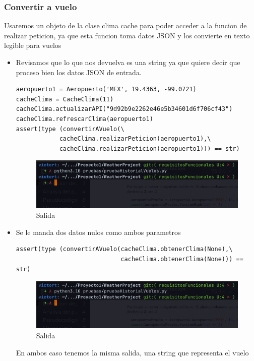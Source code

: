 \documentclass[12pt]{article}
\begin{document}
\subsubsection{Convertir a vuelo}
Usaremos un objeto de la clase clima cache para poder acceder a la funcion de realizar peticion, ya que esta funcion toma datos JSON y los convierte en texto legible para vuelos
\begin{itemize}
\item Revisamos que lo que nos devuelva es una string ya que quiere decir que proceso bien los datos JSON de entrada.
\begin{verbatim}
aeropuerto1 = Aeropuerto('MEX', 19.4363, -99.0721)
cacheClima = CacheClima(11)
cacheClima.actualizarAPI("9d92b9e2262e46e5b34601d6f706cf43")
cacheClima.refrescarClima(aeropuerto1)
assert(type (convertirAVuelo(\
            cacheClima.realizarPeticion(aeropuerto1),\
            cacheClima.realizarPeticion(aeropuerto1))) == str)
\end{verbatim}
\begin{figure}[h!]
    \centering
    \includegraphics[scale=0.7]{pruebasPy/historial/bien.png}
    \caption{Salida}
  \end{figure}
\item Se le manda dos datos nulos como ambos parametros

\begin{verbatim}
assert(type (convertirAVuelo(cacheClima.obtenerClima(None),\
                             cacheClima.obtenerClima(None))) == str)
\end{verbatim}
  \begin{figure}[h!]
    \centering
    \includegraphics[scale=0.7]{pruebasPy/historial/bien.png}
    \caption{Salida}
  \end{figure}

  En ambos caso tenemos la misma salida, una string que representa el vuelo
\end{itemize}
\end{document}
